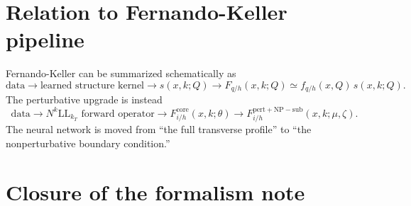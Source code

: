 \documentclass[11pt]{article}
\newcommand{\NP}{\mathrm{NP}}
\newcommand{\pert}{\mathrm{pert}}
\newcommand{\core}{\mathrm{core}}
\newcommand{\sub}{\mathrm{sub}}
\begin{document}
\section{Relation to Fernando-Keller pipeline}

Fernando-Keller can be summarized schematically as
\begin{equation}
  \text{data}
  \longrightarrow
  \text{learned structure kernel}
  \longrightarrow
  s(x,k;Q)
  \longrightarrow
  F_{q/h}(x,k;Q)\simeq f_{q/h}(x,Q)\,s(x,k;Q).
\end{equation}
The perturbative upgrade is instead
\begin{equation}
  \text{data}
  \longrightarrow
  N^k\mathrm{LL}_{k_T}\text{ forward operator}
  \longrightarrow
  F^{\core}_{i/h}(x,k;\theta)
  \longrightarrow
  F_{i/h}^{\pert+\NP-\sub}(x,k;\mu,\zeta).
\end{equation}
The neural network is moved from ``the full transverse profile'' to ``the nonperturbative
boundary condition.''


\section{Closure of the formalism note}
\label{sec:formalism-closure}
\end{document}
